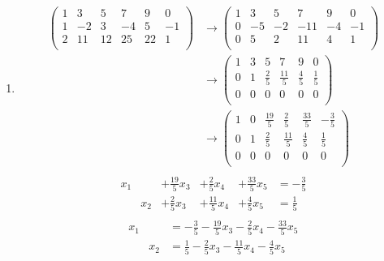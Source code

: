 \documentclass{article}
\begin{document}
\begin{enumerate}[(i)]
\begin{enumerate}
  \newpage 
  \item
    \begin{align*}
      \left(
      \begin{array}{ccccc|c}
        1 & 3  & 5  & 7  & 9  & 0  \\
        1 & -2 & 3  & -4 & 5  & -1 \\
        2 & 11 & 12 & 25 & 22 & 1  \\
      \end{array}
      \right)
      &\rightarrow
      \left(
      \begin{array}{ccccc|c}
        1 & 3  & 5  & 7   & 9  & 0  \\
        0 & -5 & -2 & -11 & -4 & -1 \\
        0 & 5  & 2  & 11  & 4  & 1  \\
      \end{array}
      \right) \\
      &\rightarrow
      \left(
      \begin{array}{ccccc|c}
        1 & 3 & 5           & 7            & 9           & 0           \\
        0 & 1 & \frac{2}{5} & \frac{11}{5} & \frac{4}{5} & \frac{1}{5} \\
        0 & 0 & 0           & 0            & 0           & 0           \\
      \end{array}
      \right) \\
      &\rightarrow
      \left(
      \begin{array}{ccccc|c}
        1 & 0 & \frac{19}{5} & \frac{2}{5}  & \frac{33}{5} & -\frac{3}{5} \\
        0 & 1 & \frac{2}{5}  & \frac{11}{5} & \frac{4}{5}  & \frac{1}{5}  \\
        0 & 0 & 0            & 0            & 0            & 0            \\
      \end{array}
      \right) \\
    \end{align*}
    \[
      \begin{array}{llllll}
        x_1 &     &+ \frac{19}{5} x_3 &+ \frac{2}{5} x_4  &+ \frac{33}{5} x_5 &= - \frac{3}{5} \\
            & x_2 &+ \frac{2}{5}  x_3 &+ \frac{11}{5} x_4 &+ \frac{4}{5} x_5  &= \frac{1}{5}  \\
      \end{array}
    \]
    \[
      \begin{array}{lll}
        x_1 &     &= - \frac{3}{5} - \frac{19}{5} x_3 - \frac{2}{5} x_4 - \frac{33}{5} x_5\\
            & x_2 &= \frac{1}{5} - \frac{2}{5} x_3 - \frac{11}{5} x_4 - \frac{4}{5}x_5 \\
      \end{array}
    \]
  \end{enumerate}
\end{enumerate}
\end{document}
